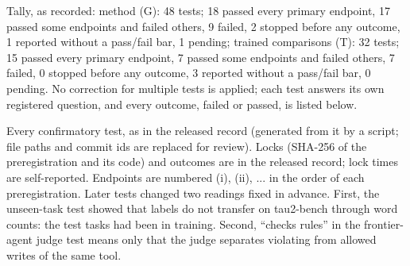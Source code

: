 Tally, as recorded: method (G): 48 tests; 18 passed every primary endpoint, 17 passed some endpoints and failed others, 9 failed, 2 stopped before any outcome, 1 reported without a pass/fail bar, 1 pending; trained comparisons (T): 32 tests; 15 passed every primary endpoint, 7 passed some endpoints and failed others, 7 failed, 0 stopped before any outcome, 3 reported without a pass/fail bar, 0 pending. No correction for multiple tests is applied; each test answers its own registered question, and every outcome, failed or passed, is listed below.

Every confirmatory test, as in the released record (generated from it by a script; file paths and commit ids are replaced for review). Locks (SHA-256 of the preregistration and its code) and outcomes are in the released record; lock times are self-reported. Endpoints are numbered (i), (ii), ... in the order of each preregistration. Later tests changed two readings fixed in advance. First, the unseen-task test showed that labels do not transfer on tau2-bench through word counts: the test tasks had been in training. Second, ``checks rules'' in the frontier-agent judge test means only that the judge separates violating from allowed writes of the same tool.

